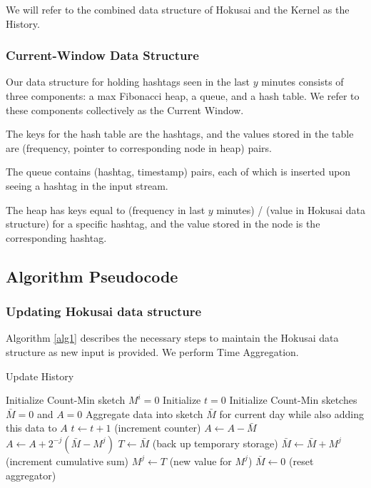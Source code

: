 \documentclass[twoside]{article}
\begin{document}
We will refer to the combined data structure of Hokusai and the Kernel as the History.

\subsubsection{Current-Window Data Structure}

Our data structure for holding hashtags seen in the last $y$ minutes consists of three components: a max Fibonacci heap, a queue, and a hash table.  We refer to these components collectively as the Current Window.

The keys for the hash table are the hashtags, and the values stored in the table are (frequency, pointer to corresponding node in heap) pairs.

The queue contains (hashtag, timestamp) pairs, each of which is inserted upon seeing a hashtag in the input stream.

The heap has keys equal to (frequency in last $y$ minutes) / (value in Hokusai data structure) for a specific hashtag, and the value stored in the node is the corresponding hashtag.


\subsection{Algorithm Pseudocode} 

\subsubsection{Updating Hokusai data structure}

Algorithm \ref{alg1} describes the necessary steps to maintain the Hokusai data structure as new input is provided. We perform Time Aggregation. 

\begin{algorithm}
\caption{Update History} \label{alg1}
\begin{algorithmic}[1]
	\State Initialize Count-Min sketch $M^i = 0$
\EndFor
\State Initialize $t = 0$
\State Initialize Count-Min sketches $\bar{M} = 0$ and $A = 0$
	\State Aggregate data into sketch $\bar{M}$ for current day while also adding this data to $A$
	\State $t \leftarrow t + 1$ (increment counter)
	\State $A \leftarrow A - \bar{M}$
		\State $A \leftarrow A + 2^{-j}(\bar{M} - M^j)$
		\State $T \leftarrow \bar{M}$ (back up temporary storage)
		\State $\bar{M} \leftarrow \bar{M} + M^j$ (increment cumulative sum)
		\State $M^j \leftarrow T$ (new value for $M^j$)
	\EndFor
	\State $\bar{M} \leftarrow 0$ (reset aggregator)
\EndWhile
\end{algorithmic}
\end{algorithm}
 
\end{document}
